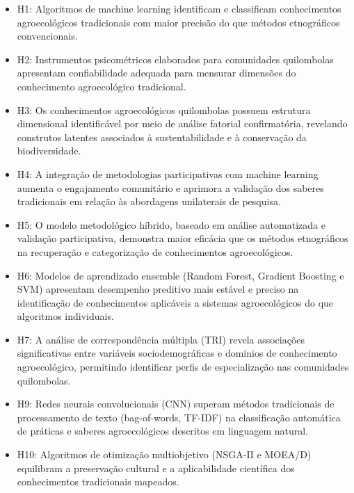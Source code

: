 \begin{itemize}

\item H1: Algoritmos de machine learning identificam e classificam conhecimentos agroecológicos tradicionais com maior precisão do que métodos etnográficos convencionais.

\item H2: Instrumentos psicométricos elaborados para comunidades quilombolas apresentam confiabilidade adequada para mensurar dimensões do conhecimento agroecológico tradicional.

\item H3: Os conhecimentos agroecológicos quilombolas possuem estrutura dimensional identificável por meio de análise fatorial confirmatória, revelando construtos latentes associados à sustentabilidade e à conservação da biodiversidade.

\item H4: A integração de metodologias participativas com machine learning aumenta o engajamento comunitário e aprimora a validação dos saberes tradicionais em relação às abordagens unilaterais de pesquisa.

\item H5: O modelo metodológico híbrido, baseado em análise automatizada e validação participativa, demonstra maior eficácia que os métodos etnográficos na recuperação e categorização de conhecimentos agroecológicos.

\item H6: Modelos de aprendizado ensemble (Random Forest, Gradient Boosting e SVM) apresentam desempenho preditivo mais estável e preciso na identificação de conhecimentos aplicáveis a sistemas agroecológicos do que algoritmos individuais.

\item H7: A análise de correspondência múltipla (TRI) revela associações significativas entre variáveis sociodemográficas e domínios de conhecimento agroecológico, permitindo identificar perfis de especialização nas comunidades quilombolas.

\item H9: Redes neurais convolucionais (CNN) superam métodos tradicionais de processamento de texto (bag-of-words, TF-IDF) na classificação automática de práticas e saberes agroecológicos descritos em linguagem natural.

\item H10: Algoritmos de otimização multiobjetivo (NSGA-II e MOEA/D) equilibram a preservação cultural e a aplicabilidade científica dos conhecimentos tradicionais mapeados.
\end{itemize}

